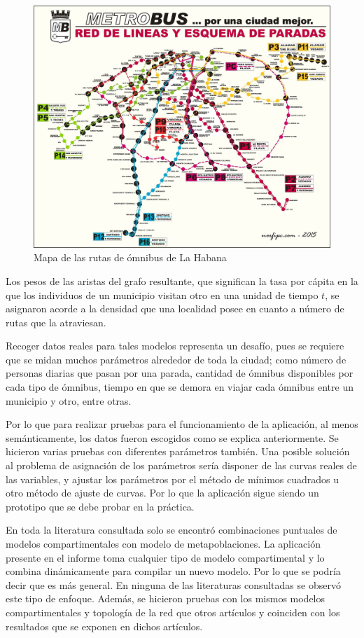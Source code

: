 \documentclass[a4paper,10pt,twocolumn]{article}
\begin{document}
\begin{figure}[H]
	\centering
	\includegraphics[width=0.7\linewidth]{map}
	\caption{Mapa de las rutas de \'omnibus de La Habana}
	\label{fig:red1---mapa-lineas-metrobus-habana}
\end{figure}

Los pesos de las aristas del grafo resultante, que significan la tasa por c\'apita en la que los individuos de un municipio visitan otro en una unidad de tiempo $t$, se asignaron acorde a la densidad que una localidad posee en cuanto a n\'umero de rutas que la atraviesan. 

Recoger datos reales para tales modelos representa un desaf\'io, pues se requiere que se midan muchos par\'ametros alrededor de toda la ciudad; como n\'umero de personas diarias que pasan por una parada, cantidad de \'omnibus disponibles por cada tipo de \'omnibus, tiempo en que se demora en viajar cada \'omnibus entre un municipio y otro, entre otras.

Por lo que para realizar pruebas para el funcionamiento de la aplicaci\'on, al menos sem\'anticamente, los datos fueron escogidos como se explica anteriormente. Se hicieron varias pruebas con diferentes par\'ametros tambi\'en. Una posible soluci\'on al problema de asignaci\'on de los par\'ametros ser\'ia disponer de las curvas reales de las variables, y ajustar los par\'ametros por el m\'etodo de m\'inimos cuadrados u otro m\'etodo de ajuste de curvas. Por lo que la aplicaci\'on sigue siendo un prototipo que se debe probar en la pr\'actica.  

En toda la literatura consultada solo se encontr\'o combinaciones puntuales de modelos compartimentales con modelo de metapoblaciones. La aplicaci\'on presente en el informe toma cualquier tipo de modelo compartimental y lo combina din\'amicamente para compilar un nuevo modelo. Por lo que se podr\'ia decir que es m\'as general. En  ninguna de las literaturas consultadas se observ\'o este tipo de enfoque. Adem\'as, se hicieron pruebas con los mismos modelos compartimentales y topolog\'ia de la red que otros art\'iculos y coinciden con los resultados que se exponen en dichos art\'iculos.
\end{document}
